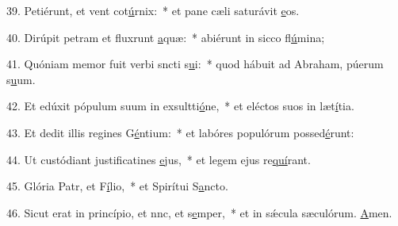 39. Petiérunt, et vent cot\uline{ú}rnix:~* et pane cæli saturávit \uline{e}os.\par 
40. Dirúpit petram et fluxrunt \uline{a}quæ:~* abiérunt in sicco fl\uline{ú}mina;\par 
41. Quóniam memor fuit verbi sncti s\uline{u}i:~* quod hábuit ad Abraham, púerum s\uline{u}um.\par 
42. Et edúxit pópulum suum in exsultti\uline{ó}ne,~* et eléctos suos in læt\uline{í}tia.\par 
43. Et dedit illis regines G\uline{é}ntium:~* et labóres populórum possed\uline{é}runt:\par 
44. Ut custódiant justificatines \uline{e}jus,~* et legem ejus re\uline{quí}rant.\par 
45. Glória Patr, et F\uline{í}lio,~* et Spirítui S\uline{a}ncto.\par 
46. Sicut erat in princípio, et nnc, et s\uline{e}mper,~* et in sǽcula sæculórum. \uline{A}men.\par 
